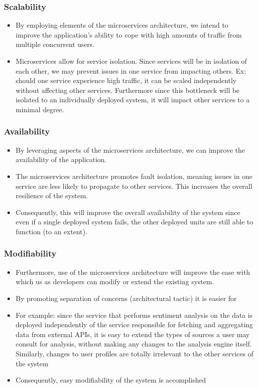 \documentclass[12pt]{article}
\begin{document}
\subsubsection*{Scalability}
\begin{itemize}
\item By employing elements of the microservices architecture, we intend to improve the application’s ability to cope with high amounts of traffic from multiple concurrent users.
\item Microservices allow for service isolation. Since services will be in isolation of each other, we may prevent issues in one service from impacting others. Ex: should one service experience high traffic, it can be scaled independently without affecting other services. Furthermore since this bottleneck will be isolated to an individually deployed system, it will impact other services to a minimal degree.
\end{itemize}

\subsubsection*{Availability}
\begin{itemize}
\item By leveraging aspects of the microservices architecture, we can improve the availability of the application.
\item The microservices architecture promotes fault isolation, meaning issues in one service are less likely to propagate to other services. This increases the overall resilience of the system.
\item Consequently, this will improve the overall availability of the system since even if a single deployed system fails, the other deployed units are still able to function (to an extent).
\end{itemize}

\subsubsection*{Modifiability}
\begin{itemize}
\item Furthermore, use of the microservices architecture will improve the ease with which us as developers can modify or extend the existing system.
\item By promoting separation of concerns (architectural tactic) it is easier for
\item For example: since the service that performs sentiment analysis on the data is deployed independently of the service responsible for fetching and aggregating data from external APIs, it is easy to extend the types of sources a user may consult for analysis, without making any changes to the analysis engine itself. Similarly, changes to user profiles are totally irrelevant to the other services of the system
\item Consequently, easy modifiability of the system is accomplished 
\end{itemize}
\end{document}
